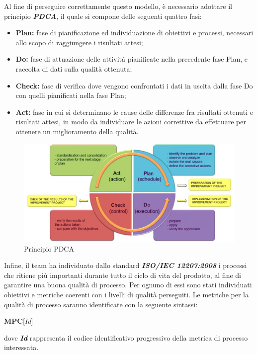 	Al fine di perseguire correttamente questo modello, è necessario adottare il principio \textbf{\textit{PDCA}}, il quale si compone delle seguenti quattro fasi:
	
	\begin{itemize}
		\item \textbf{Plan:} fase di pianificazione ed individuazione di obiettivi e processi, necessari allo scopo di raggiungere i risultati attesi;
		\item \textbf{Do:} fase di attuazione delle attività pianificate nella precedente fase Plan, e raccolta di dati sulla qualità ottenuta;
		\item \textbf{Check:} fase di verifica dove vengono confrontati i dati in uscita dalla fase Do con quelli pianificati nella fase Plan;
		\item \textbf{Act:} fase in cui si determinano le cause delle differenze fra risultati ottenuti e risultati attesi, in modo da individuare le azioni correttive da effettuare per ottenere un miglioramento della qualità.
	\end{itemize}

	\begin{figure}[H]
		\centering
		\includegraphics[scale=0.6]{includes/img/pdca.png}
		\caption{Principio PDCA}
	\end{figure}

	Infine, il team ha individuato dallo standard \textbf{\textit{ISO/IEC 12207:2008}} i processi che ritiene più importanti durante tutto il ciclo di vita del prodotto, al fine di garantire una buona qualità di processo. Per ognuno di essi sono stati individuati obiettivi e metriche coerenti con i livelli di qualità perseguiti.
	Le metriche per la qualità di processo saranno identificate con la seguente sintassi:
	\begin{center}
		\textbf{MPC}[\textit{Id}]
	\end{center}
	dove \textbf{\textit{Id}} rappresenta il codice identificativo progressivo della metrica di processo interessata.
	
